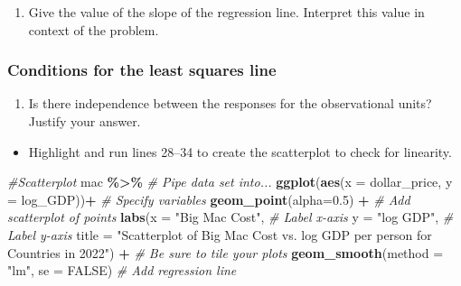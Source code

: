 \documentclass[
]{report}
\newenvironment{Shaded}{\begin{snugshade}}{\end{snugshade}}
\newcommand{\AttributeTok}[1]{\textcolor[rgb]{0.13,0.29,0.53}{#1}}
\newcommand{\CommentTok}[1]{\textcolor[rgb]{0.56,0.35,0.01}{\textit{#1}}}
\newcommand{\ConstantTok}[1]{\textcolor[rgb]{0.56,0.35,0.01}{#1}}
\newcommand{\FloatTok}[1]{\textcolor[rgb]{0.00,0.00,0.81}{#1}}
\newcommand{\FunctionTok}[1]{\textcolor[rgb]{0.13,0.29,0.53}{\textbf{#1}}}
\newcommand{\NormalTok}[1]{#1}
\newcommand{\SpecialCharTok}[1]{\textcolor[rgb]{0.81,0.36,0.00}{\textbf{#1}}}
\newcommand{\StringTok}[1]{\textcolor[rgb]{0.31,0.60,0.02}{#1}}
\providecommand{\tightlist}{%
  \setlength{\itemsep}{0pt}\setlength{\parskip}{0pt}}
\begin{document}
\begin{enumerate}
\def\labelenumi{\arabic{enumi}.}
\setcounter{enumi}{3}
\tightlist
\item
  Give the value of the slope of the regression line. Interpret this value in context of the problem.
  \vspace{0.6in}
\end{enumerate}

\hypertarget{conditions-for-the-least-squares-line-1}{%
\subsubsection*{Conditions for the least squares line}\label{conditions-for-the-least-squares-line-1}}

\begin{enumerate}
\def\labelenumi{\arabic{enumi}.}
\setcounter{enumi}{4}
\tightlist
\item
  Is there independence between the responses for the observational units? Justify your answer.
\end{enumerate}

\vspace{0.3in}

\begin{itemize}
\tightlist
\item
  Highlight and run lines 28--34 to create the scatterplot to check for linearity.
\end{itemize}

\begin{Shaded}
\begin{Highlighting}[]
\CommentTok{\#Scatterplot}
\NormalTok{mac }\SpecialCharTok{\%\textgreater{}\%} \CommentTok{\# Pipe data set into...}
  \FunctionTok{ggplot}\NormalTok{(}\FunctionTok{aes}\NormalTok{(}\AttributeTok{x =}\NormalTok{ dollar\_price, }\AttributeTok{y =}\NormalTok{ log\_GDP))}\SpecialCharTok{+}  \CommentTok{\# Specify variables}
  \FunctionTok{geom\_point}\NormalTok{(}\AttributeTok{alpha=}\FloatTok{0.5}\NormalTok{) }\SpecialCharTok{+}  \CommentTok{\# Add scatterplot of points}
  \FunctionTok{labs}\NormalTok{(}\AttributeTok{x =} \StringTok{"Big Mac Cost"}\NormalTok{,  }\CommentTok{\# Label x{-}axis}
       \AttributeTok{y =} \StringTok{"log GDP"}\NormalTok{,  }\CommentTok{\# Label y{-}axis}
       \AttributeTok{title =} \StringTok{"Scatterplot of Big Mac Cost vs. log GDP per person}
\StringTok{       for Countries in 2022"}\NormalTok{) }\SpecialCharTok{+}  \CommentTok{\# Be sure to tile your plots}
  \FunctionTok{geom\_smooth}\NormalTok{(}\AttributeTok{method =} \StringTok{"lm"}\NormalTok{, }\AttributeTok{se =} \ConstantTok{FALSE}\NormalTok{)  }\CommentTok{\# Add regression line}
\end{Highlighting}
\end{Shaded}
\end{document}
